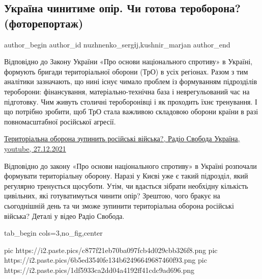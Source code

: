  
 
 
 
 
\subsection{Україна чинитиме опір. Чи готова тероборона? (фоторепортаж)}
\label{sec:29_12_2021.stz.news.ua.radiosvoboda.1.teroborona}

\ifcmt
 author_begin
   author_id nuzhnenko_sergіj,kushnir_marjan
 author_end
\fi

Відповідно до Закону України «Про основи національного спротиву» в Україні,
формують бригади територіальної оборони (ТрО) в усіх регіонах. Разом з тим
аналітики зазначають, що нині існує чимало проблем із формуванням підрозділів
тероборони: фінансування, матеріально-технічна база і неврегульований час на
підготовку. Чим живуть столичні тероборонівці і як проходить їхнє тренування. І
що потрібно зробити, щоб ТрО стала важливою складовою оборони країни в разі
повномасштабної російської агресії.

\href{https://www.youtube.com/watch?v=JUxKN_znObA}{%
Територіальна оборона зупинить російські війська?, Радіо Свобода Україна, youtube, 27.12.2021%
}

Відповідно до закону «Про основи національного спротиву» в Україні розпочали
формувати територіальну оборону. Наразі у Києві уже є такий підрозділ, який
регулярно тренується щосуботи. Утім, чи вдасться зібрати необхідну кількість
цивільних, які готуватимуться чинити опір? Зрештою, чого бракує на сьогоднішній
день та чи зможе зупинити територіальна оборона російські війська? Деталі у
відео Радіо Свобода.


\ifcmt
  tab_begin cols=3,no_fig,center

     pic https://i2.paste.pics/c877f21eb70ba097fcb4d029cbb326f8.png
		 pic https://i2.paste.pics/6b5ed3540fe134b62496649687460f93.png
		 pic https://i2.paste.pics/1df5933ca2dd04a4192ff41cdc9ad696.png

